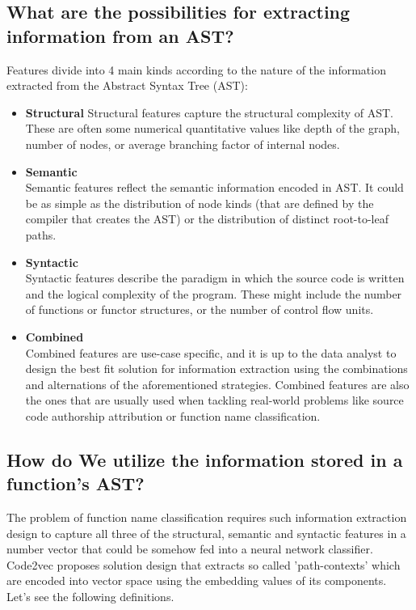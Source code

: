 \documentclass[10pt,english,a4paper]{report}
\begin{document}
\subsection{What are the possibilities for extracting information from an AST?}
Features divide into 4 main kinds according to the nature of the information extracted from the Abstract Syntax Tree (AST):
\begin{itemize}
    \item \textbf{Structural} \label{item:structural}
    Structural features capture the structural complexity of AST. These are often some numerical quantitative values like depth of the graph, number of nodes, or average branching factor of internal nodes.
    \item \textbf{Semantic} \\
    Semantic features reflect the semantic information encoded in AST. It could be as simple as the distribution of node kinds (that are defined by the compiler that creates the AST) or the distribution of distinct root-to-leaf paths.
    \item \textbf{Syntactic} \\
    Syntactic features describe the paradigm in which the source code is written and the logical complexity of the program. These might include the number of functions or functor structures, or the number of control flow units.
    \item \textbf{Combined} \\
    Combined features are use-case specific, and it is up to the data analyst to design the best fit solution for information extraction using the combinations and alternations of the aforementioned strategies. Combined features are also the ones that are usually used when tackling real-world problems like source code authorship attribution or function name classification.  
\end{itemize}

\subsection{How do We utilize the information stored in a function's AST?}
The problem of function name classification requires such information extraction design to capture all three of the structural, semantic and syntactic features in a number vector that could be somehow fed into a neural network classifier. Code2vec \cite{code2vec} proposes solution design that extracts so called 'path-contexts' which are encoded into vector space using the embedding values of its components. Let's see the following definitions.
\end{document}
